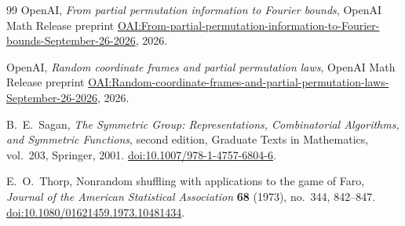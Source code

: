 \begin{thebibliography}{99}
OpenAI,
\emph{From partial permutation information to Fourier bounds},
OpenAI Math Release preprint
\href{https://github.com/openai/math/blob/main/preprints/From-partial-permutation-information-to-Fourier-bounds-September-26-2026/main.pdf}{OAI:From-partial-permutation-information-to-Fourier-bounds-September-26-2026},
2026.

OpenAI,
\emph{Random coordinate frames and partial permutation laws},
OpenAI Math Release preprint
\href{https://github.com/openai/math/blob/main/preprints/Random-coordinate-frames-and-partial-permutation-laws-September-26-2026/main.pdf}{OAI:Random-coordinate-frames-and-partial-permutation-laws-September-26-2026},
2026.

B.~E.~Sagan,
\emph{The Symmetric Group: Representations, Combinatorial Algorithms,
and Symmetric Functions}, second edition,
Graduate Texts in Mathematics, vol.~203, Springer, 2001.
\href{https://doi.org/10.1007/978-1-4757-6804-6}
{doi:10.1007/978-1-4757-6804-6}.

E.~O.~Thorp,
Nonrandom shuffling with applications to the game of Faro,
\emph{Journal of the American Statistical Association} \textbf{68}
(1973), no.~344, 842--847.
\href{https://doi.org/10.1080/01621459.1973.10481434}
{doi:10.1080/01621459.1973.10481434}.

\end{thebibliography}
